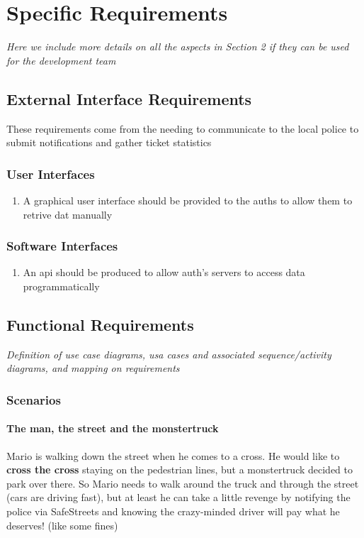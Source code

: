 \documentclass{article}
\begin{document}
\section{Specific Requirements} \textit{Here we include more details on all the aspects in Section 2 if they can be used for the development team}
	\subsection{External Interface Requirements}
		These requirements come from the needing to communicate to the local police to submit notifications and gather ticket statistics
		\subsubsection{User Interfaces}
			\begin{enumerate}
				\item A graphical user interface should be provided to the auths to allow them to retrive dat manually
			\end{enumerate}
		\subsubsection{Software Interfaces}
			\begin{enumerate}
					\item An api should be produced to allow auth's servers to access data programmatically
			\end{enumerate}
	\subsection{Functional Requirements} \textit{Definition of use case diagrams, usa cases and associated sequence/activity diagrams, and mapping on requirements}
		\subsubsection{Scenarios}
			\paragraph{The man, the street and the monstertruck}
				Mario is walking down the street when he comes to a cross. He would like to \textbf{cross the cross} staying on the pedestrian lines, but a monstertruck decided to park over there. So Mario needs to walk around the truck and through the street (cars are driving fast), but at least he can take a little revenge by notifying the police via SafeStreets and knowing the crazy-minded driver will pay what he deserves! (like some fines)
\end{document}
